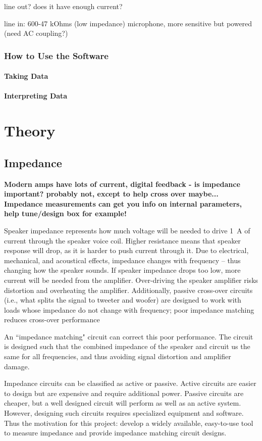 \documentclass[10pt]{book}
\begin{document}
line out? does it have enough current?

line in: 600-47 kOhms (low impedance)
microphone, more sensitive but powered (need AC coupling?)
\section{How to Use the Software}
\subsection{Taking Data}
\subsection{Interpreting Data}
\part{Theory}
\chapter{Impedance}\label{Impedance}
\textbf{Modern amps have lots of current, digital feedback - is impedance important? probably not, except to help cross over maybe... Impedance measurements can get you info on internal parameters, help tune/design box for example!}

Speaker impedance represents how much voltage will be needed to drive 1~A of current  through the speaker voice coil. Higher resistance means that speaker response will drop, as it is harder to push current through it. Due to electrical, mechanical, and acoustical effects, impedance changes with frequency -- thus changing how the speaker sounds. If speaker impedance drops too low, more current will be needed from the amplifier. Over-driving the speaker amplifier risks distortion and overheating the amplifier. Additionally, passive cross-over circuits (i.e., what splits the signal to tweeter and woofer) are designed to work with loads whose impedance do not change with frequency; poor impedance matching reduces cross-over performance

An ``impedance matching" circuit can correct this poor performance. The circuit is designed such that the combined impedance of the speaker and circuit us the same for all frequencies, and thus avoiding signal distortion and amplifier damage.

Impedance circuits can be classified as active or passive. Active circuits are easier to design but are expensive and require additional power. Passive circuits are cheaper, but a well designed circuit will perform as well as an active system. However, designing such circuits requires specialized equipment and software. Thus the motivation for this project: develop a widely available, easy-to-use tool to measure impedance and provide impedance matching circuit designs.
\end{document}
